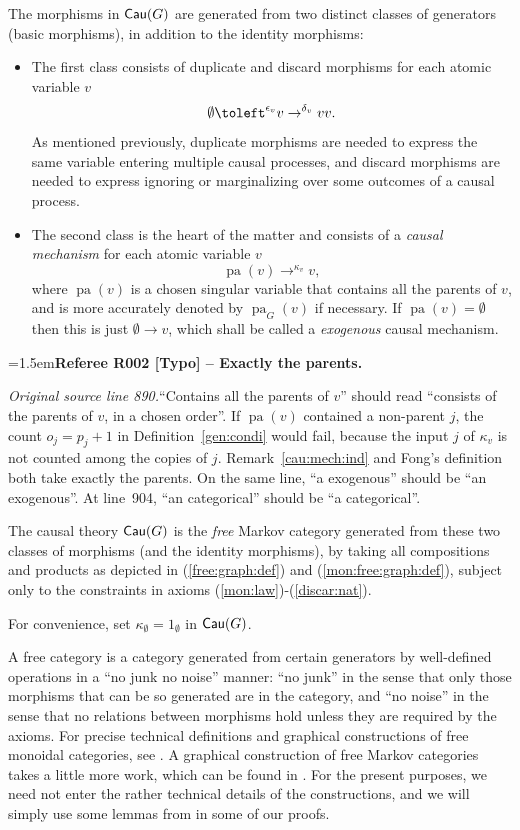 \documentclass[12pt]{amsart}
\newcommand{\RefereeRemark}[4]{%
  \par\medskip\begingroup\normalfont\small\color{RefereePurple}%
  \emergencystretch=1.5em\noindent\textbf{Referee R#1 [#2] -- #3.}\par\nobreak\noindent #4\par
  \endgroup\medskip
}
\theoremstyle{plain}
\theoremstyle{definition}
\theoremstyle{remark}
\numberwithin{equation}{section}
\theoremstyle{plain}
\newcommand{\0}{\emptyset}
\newcommand{\fun}{\longrightarrow}
\newcommand{\cat}[1]{\textup{\textsf{#1}}}
\DeclareMathOperator{\cau}{\sf{Cau}}
\DeclareMathOperator{\pa}{pa}
\newcommand{\memph}[1]{{\color{magenta}\emph{#1}}}
\begin{document}
The morphisms in $\cat{Cau}(G)$ are generated from two distinct classes of generators (basic morphisms), in addition to the identity morphisms:
\begin{itemize}
  \item The first class consists of duplicate and discard morphisms for each atomic variable $v$
  \[
  \0 \toleft^{\epsilon_v} v \to^{\delta_v} vv.
   \]
   As mentioned previously, duplicate morphisms are needed to express the same variable entering multiple causal processes, and discard morphisms are needed to express ignoring or marginalizing over some outcomes of a causal process.
 \item The second class is the heart of the matter and consists of a \memph{causal mechanism} for each atomic variable $v$
      \[
      \pa(v) \to^{\kappa_v} v,
       \]
       where $\pa(v)$ is a chosen singular variable that contains all the parents of $v$,  and is more accurately denoted by $\pa_{G}(v)$ if necessary.  If $\pa(v) = \0$ then this is just $\0 \fun v$, which shall be called a \memph{exogenous} causal mechanism.
\end{itemize}
\hypertarget{review-002}{}\RefereeRemark{002}{Typo}{Exactly the parents}{%
\textit{Original source line 890.}\quad ``Contains all the parents of $v$'' should read ``consists of the parents of $v$, in a chosen order''. If $\pa(v)$ contained a non-parent $j$, the count $o_j = p_j + 1$ in Definition~\ref{gen:condi} would fail, because the input $j$ of $\kappa_v$ is not counted among the copies of $j$. Remark~\ref{cau:mech:ind} and Fong's definition \cite[\S~4]{Fong:thesis} both take exactly the parents. On the same line, ``a exogenous'' should be ``an exogenous''. At line~904, ``an categorical'' should be ``a categorical''.
}

The causal theory $\cat{Cau}(G)$ is the \memph{free} Markov category generated from these two classes of morphisms (and the identity morphisms), by taking all compositions and products as depicted in (\ref{free:graph:def}) and (\ref{mon:free:graph:def}), subject only to the constraints in axioms (\ref{mon:law})-(\ref{discar:nat}).


For convenience, set $\kappa_\0 = 1_\0$ in $\cau(G)$.

A free category is a category generated from certain generators by well-defined operations in a ``no junk no noise'' manner: ``no junk'' in the sense that only those morphisms that can be so generated are in the category,  and ``no noise'' in the sense that no relations between morphisms hold unless they are required by the axioms.  For precise technical definitions and graphical constructions of free monoidal categories, see \cite{selinger2010survey}.  A graphical construction of free Markov categories takes a little more work,  which can be found in \cite{YinZhangModularity}.  For the present purposes,  we need not enter the rather technical details of the constructions, and we will simply use some lemmas from \cite{YinZhangModularity} in some of our proofs.
\end{document}
